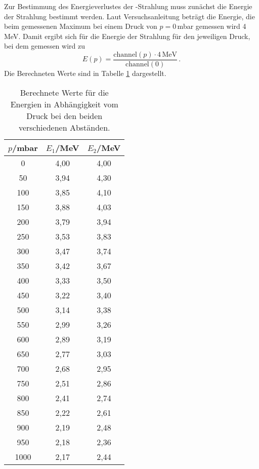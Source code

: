 Zur Bestimmung des Energieverlustes der \alpha-Strahlung muss zunächst die Energie
der Strahlung bestimmt werden. Laut Versuchsanleitung \cite{Versuchsanleitung}
beträgt die Energie, die beim gemessenen Maximum bei einem Druck von $p=0\,$mbar
gemessen wird 4\,MeV. Damit ergibt sich für die Energie der Strahlung für den jeweiligen
Druck, bei dem gemessen wird zu
\begin{equation}
  E(p)=\frac{\text{channel}(p)\cdot4\,\text{MeV}}{\text{channel}(0)} \,.
\end{equation}
Die Berechneten Werte sind in Tabelle \ref{tab:energie} dargestellt.

\begin{table}[htp]
	\begin{center}
    \caption{Berechnete Werte für die Energien
    in Abhängigkeit vom Druck bei den beiden verschiedenen Abständen.}
    \label{tab:energie}
		\begin{tabular}{ccc}
		\toprule
			{$p$/mbar} & {$E_1$/MeV} & {$E_2$/MeV}\\
			\midrule
			0 & 4,00 & 4,00\\
			50 & 3,94 & 4,30\\
			100 & 3,85 & 4,10\\
			150 & 3,88 & 4,03\\
			200 & 3,79 & 3,94\\
			250 & 3,53 & 3,83\\
			300 & 3,47 & 3,74\\
			350 & 3,42 & 3,67\\
			400 & 3,33 & 3,50\\
			450 & 3,22 & 3,40\\
			500 & 3,14 & 3,38\\
			550 & 2,99 & 3,26\\
			600 & 2,89 & 3,19\\
			650 & 2,77 & 3,03\\
			700 & 2,68 & 2,95\\
			750 & 2,51 & 2,86\\
			800 & 2,41 & 2,74\\
			850 & 2,22 & 2,61\\
			900 & 2,19 & 2,48\\
			950 & 2,18 & 2,36\\
			1000 & 2,17 & 2,44\\
		\bottomrule
		\end{tabular}
	\end{center}
\end{table}

